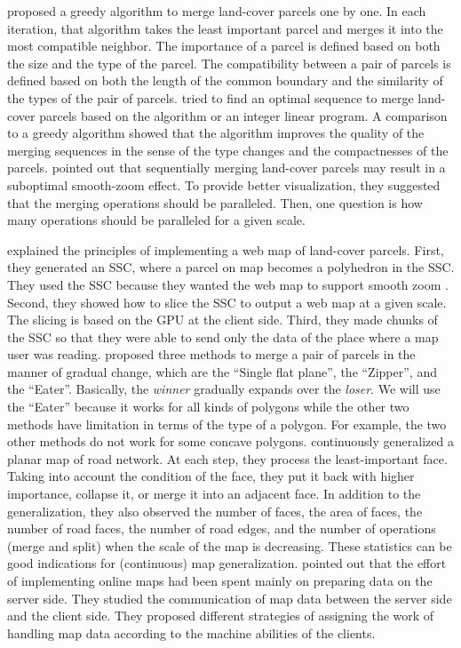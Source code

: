 \documentclass[ijgi,article,submit,moreauthors,pdftex]{Definitions/mdpi}
\begin{document}
\citet{vanOosterom2005} proposed a greedy algorithm 
to merge land-cover parcels one by one.
In each iteration, that algorithm takes the least important parcel and 
merges it into the most compatible neighbor.
The importance of a parcel is defined 
based on both the size and the type of the parcel.
The compatibility between a pair of parcels is defined based on 
both the length of the common boundary and the similarity of the types 
of the pair of parcels. 
\citet[]{Peng2019Thesis} tried to find an optimal sequence 
to merge land-cover parcels
based on the \Astar algorithm or an integer linear program.
A comparison to a greedy algorithm showed that 
the \Astar algorithm improves the quality of the merging sequences
in the sense of the type changes and the compactnesses of the parcels.
\citet{vanOosterom2014Support} pointed out that sequentially merging
land-cover parcels may result in a suboptimal smooth-zoom effect.
To provide better visualization, they suggested that
the merging operations should be paralleled.
Then, one question is how many operations 
should be paralleled for a given scale.

\citet{Meijers2020Web} explained the principles of 
implementing a web map of land-cover parcels.
First, they generated an SSC, 
where a parcel on map becomes a polyhedron in the SSC.
They used the SSC because 
they wanted the web map to support smooth zoom
\citep[see][]{vanOosterom2014Support}.
Second, they showed how to slice the SSC 
to output a web map at a given scale.
The slicing is based on the GPU at the client side.
Third, they made chunks of the SSC 
so that they were able to send only the data of the place
where a map user was reading.
\citet{Suba2014Merge} proposed three methods 
to merge a pair of parcels in the manner of gradual change, 
which are the ``Single flat plane'', the ``Zipper'', and the ``Eater''.
Basically, the \emph{winner} gradually expands over the \emph{loser}.
We will use the ``Eater'' because it works for all kinds of polygons 
while the other two methods have limitation 
in terms of the type of a polygon.
For example, the two other methods do not work for some concave polygons.
\citet{Suba2016Road} continuously generalized a planar map of road network.
At each step, they process the least-important face.
Taking into account the condition of the face,
they put it back with higher importance, collapse it, 
or merge it into an adjacent face.
In addition to the generalization, 
they also observed the number of faces,
the area of faces, the number of road faces, the number of road edges,
and the number of operations (merge and split) 
when the scale of the map is decreasing.
These statistics can be good indications 
for (continuous) map generalization.
\citet{Huang2016Webmap} pointed out that
the effort of implementing online maps 
had been spent mainly on preparing data on the server side.
They studied the communication of map data 
between the server side and the client side.
They proposed different strategies of assigning 
the work of handling map data
according to the machine abilities of the clients.
\end{document}
